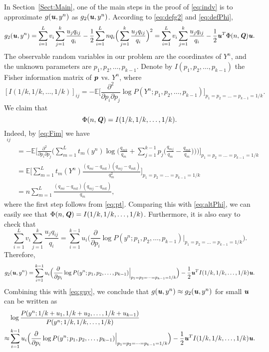 \documentclass[11pt,onecolumn]{IEEEtran}
\def\mathbi#1{{\textbf{\textit #1}}}
\begin{document}
In Section~\ref{Sect:Main}, one of the main steps in the proof of \eqref{eq:indv} is to approximate
 $g(\mathbi{u},y^n)$ as $g_2(\mathbi{u},y^n)$.
According to \eqref{eq:defg2} and \eqref{eq:defPhi},
$$
g_2(\mathbi{u},y^n) =
\sum_{i=1}^L  v_i \sum_{j=1}^k \frac{u_j q_{ij}}{q_i}
-\frac{1}{2} \sum_{i=1}^L  n q_i  \Big(\sum_{j=1}^k \frac{u_j q_{ij}}{q_i} \Big)^2 =
\sum_{i=1}^L  v_i \sum_{j=1}^k \frac{u_j q_{ij}}{q_i}
- \frac{1}{2} \mathbi{u}^T \Phi(n,\mathbi{Q}) \mathbi{u}.
$$
The observable random variables in our problem are the coordinates of $Y^n$, and the unknown parameters are
$p_1,p_2,\dots,p_{k-1}.$ Denote by $I(p_1,p_2,\dots,p_{k-1})$ the Fisher information matrix of $\mathbi{p}$ vs. $Y^n$, where
   \begin{equation}\label{eq:Fim}
   [I(1/k,1/k,\dots,1/k)]_{ij} 
= - \mathbb{E}\Big[ \frac{\partial^2}{\partial p_i \partial p_j} \log P(Y^n;p_1,p_2,\dots,p_{k-1}) 
 \Big]_{p_1=p_2=\dots=p_{k-1}=1/k}.
 \end{equation}
We claim that
$$
\Phi(n,\mathbi{Q}) = I(1/k,1/k,\dots,1/k).
$$
Indeed, by \eqref{eq:Fim} we have
\begin{align*}
 [I(1/k,&1/k,\dots,1/k)]_{ij} \\
&= - \mathbb{E}\Big[ \frac{\partial^2}{\partial p_i \partial p_j} 
\Big( \sum_{m=1}^{L}  t_m(y^n) \log 
\Big(\frac{q_{mk}}{q_m}+
\sum_{j=1}^{k-1}p_j \Big(\frac{q_{mj}}{q_m}-\frac{q_{mk}}{q_m} \Big) \Big) \Big) 
 \Big]_{p_1=p_2=\dots=p_{k-1}=1/k} \\
& = \mathbb{E} \Big[ \sum_{m=1}^L t_m(Y^n) 
\frac{(q_{mi}-q_{mk})(q_{mj}-q_{mk})}{q_m^2} \Big]_{p_1=p_2=\dots=p_{k-1}=1/k} \\
& = n \sum_{m=1}^L  
\frac{(q_{mi}-q_{mk})(q_{mj}-q_{mk})}{q_m},
\end{align*}
where the first step follows from \eqref{eq:pt}.
Comparing this with \eqref{eq:altPhi}, we can easily see that $\Phi(n,\mathbi{Q}) = I(1/k,1/k,\dots,1/k)$.
Furthermore, it is also easy to check that
$$
\sum_{i=1}^L  v_i \sum_{j=1}^k \frac{u_j q_{ij}}{q_i}
= \sum_{i=1}^{k-1} u_i \Big( \frac{\partial}{\partial p_i}
\log P(y^n;p_1,p_2,\dots,p_{k-1}) \Big|_{p_1=p_2=\dots=p_{k-1}=1/k} \Big).
$$
Therefore,
$$
g_2(\mathbi{u},y^n) = \sum_{i=1}^{k-1} u_i \Big( \frac{\partial}{\partial p_i}
\log P(y^n;p_1,p_2,\dots,p_{k-1}) \Big|_{p_1=p_2=\dots=p_{k-1}=1/k} \Big) -
 \frac{1}{2} \mathbi{u}^T I(1/k,1/k,\dots,1/k) \mathbi{u}.
$$
Combining this with \eqref{eq:guy}, we conclude that $g(\mathbi{u},y^n) \approx g_2(\mathbi{u},y^n)$
for small $\mathbi{u}$ can be written as
\begin{align*}
& \log \frac{P(y^n;1/k+u_1,1/k+u_2,\dots,1/k+u_{k-1})}{P(y^n;1/k,1/k,\dots,1/k)} \\
\approx & \sum_{i=1}^{k-1} u_i \Big( \frac{\partial}{\partial p_i}
\log P(y^n;p_1,p_2,\dots,p_{k-1}) \Big|_{p_1=p_2=\dots=p_{k-1}=1/k} \Big) -
 \frac{1}{2} \mathbi{u}^T I(1/k,1/k,\dots,1/k) \mathbi{u}.
\end{align*}
\end{document}
